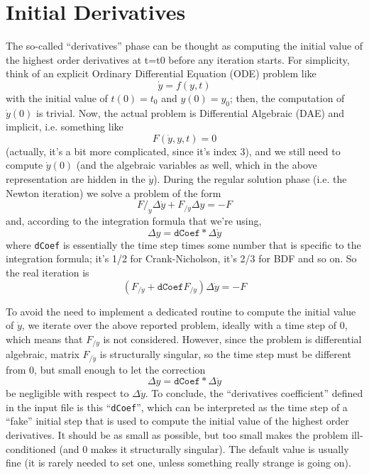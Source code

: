 \documentclass[10pt,dvips]{report}
\begin{document}
\section{Initial Derivatives}
The so-called ``derivatives'' phase can be thought as computing the initial value of the highest order derivatives at t=t0 before any iteration starts.  For simplicity, think of an explicit Ordinary Differential Equation (ODE) problem like
\begin{displaymath}
  \dot{y} = f(y, t)
\end{displaymath}
with the initial value of $t(0) = t_0$ and $y(0) = y_0$; 
then, the computation of $\dot{y}(0)$ is trivial.  
Now, the actual problem is Differential Algebraic (DAE) and implicit, 
i.e. something like
\begin{displaymath}
  F(\dot{y}, y, t) = 0
\end{displaymath}
(actually, it's a bit more complicated, since it's index 3), 
and we still need to compute $\dot{y}(0)$ 
(and the algebraic variables as well, 
which in the above representation are hidden in the $\dot{y}$).
During the regular solution phase (i.e. the Newton iteration) 
we solve a problem of the form
\begin{displaymath}
  F/_{\dot{y}} \Delta \dot{y} + F_{/y} \Delta y = - F
\end{displaymath}
and, according to the integration formula that we're using,
\begin{displaymath}
  \Delta y = \texttt{dCoef} * \Delta \dot{y}
\end{displaymath}
where \texttt{dCoef} is essentially the time step times some number that is specific to the integration formula; it's 1/2 for Crank-Nicholson, it's 2/3 for BDF and so on.
So the real iteration is
\begin{displaymath}
  ( F_{/\dot{y}} + \texttt{dCoef} F_{/y} ) \Delta \dot{y} = - F
\end{displaymath}

To avoid the need to implement a dedicated routine to compute 
the initial value of $\dot{y}$, we iterate over the above reported problem, 
ideally with a time step of $0$, which means that $F_{/y}$ is not considered.  
However, since the problem is differential algebraic, 
matrix $F_{/\dot{y}}$ is structurally singular, so the time step 
must be different from $0$, but small enough to let the correction
\begin{displaymath}
  \Delta y = \texttt{dCoef} * \Delta \dot{y}
\end{displaymath}
be negligible with respect to $\Delta \dot{y}$.  
To conclude, the ``derivatives coefficient'' defined in the input file 
is this ``\texttt{dCoef}'', 
which can be interpreted as the time step of a ``fake'' 
initial step that is used to compute the initial value of 
the highest order derivatives.  
It should be as small as possible, but too small makes 
the problem ill-conditioned (and $0$ makes it structurally singular).  
The default value is usually fine 
(it is rarely needed to set one, unless something 
really strange is going on).\\
\end{document}

